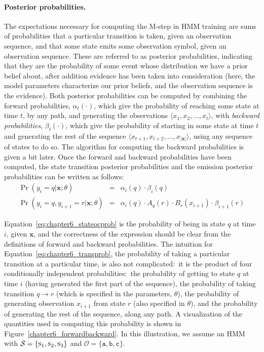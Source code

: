 \paragraph{\textbf{Posterior probabilities.}}

The expectations necessary for computing the M-step in HMM training
are sums of probabilities that a particular transition is taken, given
an observation sequence, and that some state emits some observation
symbol, given an observation sequence.  These are referred to as
posterior probabilities, indicating that they are the probability of
some event whose distribution we have a prior belief about, after
addition evidence has been taken into consideration (here, the model
parameters characterize our prior beliefs, and the observation
sequence is the evidence).  Both posterior probabilities can be
computed by combining the forward probabilities, $\alpha_t(\cdot)$,
which give the probability of reaching some state at time $t$, by any
path, and generating the observations $\langle x_1, x_2, \ldots , x_t
\rangle$, with \emph{backward probabilities}, $\beta_t(\cdot)$, which
give the probability of starting in some state at time $t$ and
generating the rest of the sequence $\langle x_{t+1}, x_{t+2}, \ldots
, x_{|\textbf{x}|} \rangle$, using any sequence of states to do so.
The algorithm for computing the backward probabilities is given a bit
later.  Once the forward and backward probabilities have been
computed, the state transition posterior probabilities and the
emission posterior probabilities can be written as follows:
\begin{eqnarray}
\label{eq:chapter6_stateocprob} \Pr(y_i = q | \textbf{x}; \theta) & = & \alpha_i(q) \cdot \beta_i(q) \\
\Pr(y_i = q , y_{i+1} = r | \textbf{x}; \theta) & = & \alpha_i(q) \cdot A_q(r) \cdot B_r(x_{i+1}) \cdot \beta_{i+1}(r) \label{eq:chapter6_transprob}
\end{eqnarray}

\noindent Equation~\ref{eq:chapter6_stateocprob} is the probability of
being in state $q$ at time $i$, given $\textbf{x}$, and the
correctness of the expression should be clear from the definitions of
forward and backward probabilities.  The intuition for
Equation~\ref{eq:chapter6_transprob}, the probability of taking a
particular transition at a particular time, is also not
complicated:\ it is the product of four conditionally independent
probabilities:\ the probability of getting to state $q$ at time $i$
(having generated the first part of the sequence), the probability of
taking transition $q \rightarrow r$ (which is specified in the
parameters, $\theta$), the probability of generating observation
$x_{i+1}$ from state $r$ (also specified in $\theta$), and the
probability of generating the rest of the sequence, along any path.  A
visualization of the quantities used in computing this probability is
shown in Figure~\ref{chapter6_forwardbackward}.  In this illustration,
we assume an HMM with $\mathcal{S} = \{ \textsc{s}_1, \textsc{s}_2,
\textsc{s}_3 \}$ and $\mathcal{O}=\{\texttt{a}, \texttt{b}, \texttt{c}
\}$.

